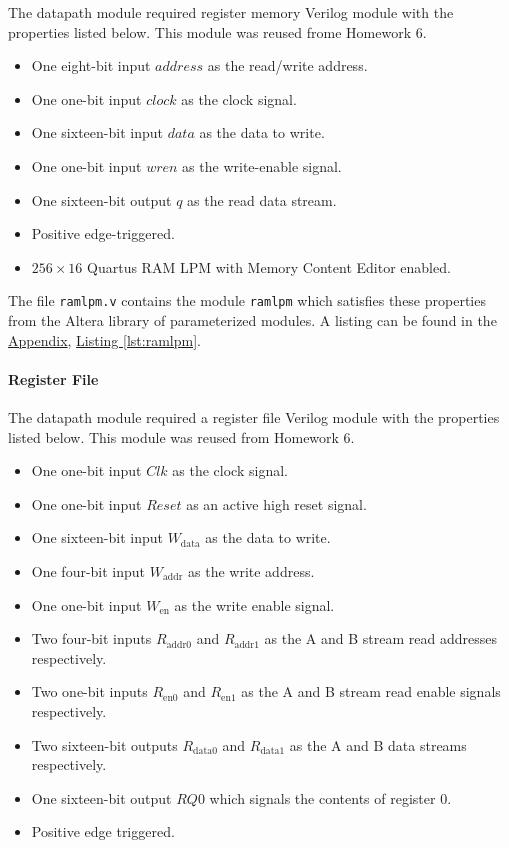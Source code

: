 The datapath module required register memory Verilog module with the properties listed below.
This module was reused frome Homework 6.

\begin{itemize}
    \item One eight-bit input $address$ as the read/write address.
    \item One one-bit input $clock$ as the clock signal.
    \item One sixteen-bit input $data$ as the data to write.
    \item One one-bit input $wren$ as the write-enable signal.
    \item One sixteen-bit output $q$ as the read data stream.
    \item Positive edge-triggered.
    \item $256 \times 16$ Quartus RAM LPM with Memory Content Editor enabled.
\end{itemize}

The file \verb|ramlpm.v| contains the module \verb|ramlpm| which satisfies these properties from the Altera library of parameterized modules.
A listing can be found in the \hyperref[sec:appendix]{Appendix}, \hyperref[lst:ramlpm]{Listing \ref*{lst:ramlpm}}.

\paragraph{Register File} \label{par:regfile}

The datapath module required a register file Verilog module with the properties listed below.
This module was reused from Homework 6.

\begin{itemize}
    \item One one-bit input $Clk$ as the clock signal.
    \item One one-bit input $Reset$ as an active high reset signal.
    \item One sixteen-bit input $W_\text{data}$ as the data to write.
    \item One four-bit input $W_\text{addr}$ as the write address.
    \item One one-bit input $W_\text{en}$ as the write enable signal.
    \item Two four-bit inputs $R_\text{addr0}$ and $R_\text{addr1}$ as the A and B stream read addresses respectively.
    \item Two one-bit inputs $R_\text{en0}$ and $R_\text{en1}$ as the A and B stream read enable signals respectively.
    \item Two sixteen-bit outputs $R_\text{data0}$ and $R_\text{data1}$ as the A and B data streams respectively.
    \item One sixteen-bit output $RQ0$ which signals the contents of register 0.
    \item Positive edge triggered.
\end{itemize}

